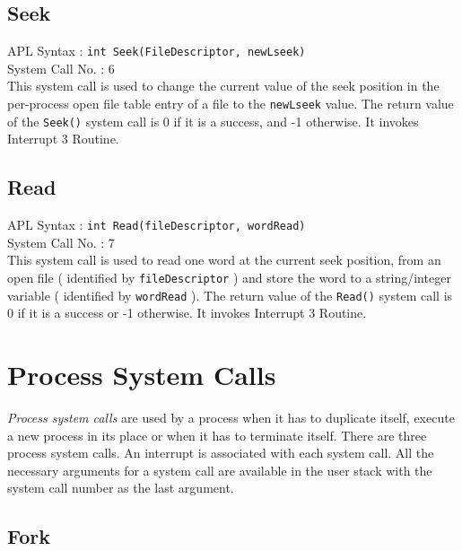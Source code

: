 \documentclass[10pt]{report}
\newcounter{syscall}
\begin{document}
\subsection{Seek}
\label{sec:seek()}

APL Syntax : \texttt{int Seek(FileDescriptor, newLseek)}  \\
System Call No. : 6 \\

This system call is used to change the current value of the seek position in the per-process open file table entry of a file to the \texttt{newLseek} value. The return value of the \texttt{Seek()} system call is 0 if it is a success, and -1 otherwise. It invokes Interrupt 3 Routine.\\


\subsection{Read}
\label{sec:read()}

APL Syntax : \texttt{int Read(fileDescriptor, wordRead)}  \\
System Call No. : 7 \\

This system call is used to read one word at the current seek position, from an open file ( identified by \texttt{fileDescriptor} ) and store the word to a string/integer variable ( identified by \texttt{wordRead} ). The return value of the \texttt{Read()} system call is 0 if it is a success or -1 otherwise. It invokes Interrupt 3 Routine.\\


	
\section{Process System Calls}
\label{sec:procsyscall}
\textit{Process system calls} are used by a process when it has to duplicate itself, execute a new process in its place or when it has to terminate itself. There are three process system calls. An interrupt is associated with each system call. All the necessary arguments for a system call are available in the user stack with the system call number as the last argument.\\


\subsection{Fork}
\label{sec:fork()}
\end{document}
